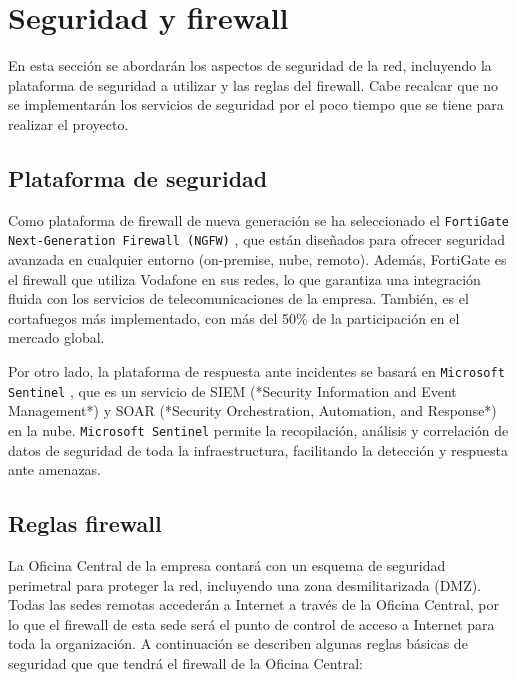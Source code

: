 \section{Seguridad y firewall}
En esta sección se abordarán los aspectos de seguridad de la red, incluyendo la plataforma de seguridad
a utilizar y las reglas del firewall. Cabe recalcar que no se implementarán los servicios de seguridad por
el poco tiempo que se tiene para realizar el proyecto.

\subsection{Plataforma de seguridad}
Como plataforma de firewall de nueva generación se ha seleccionado el \texttt{FortiGate Next-Generation Firewall (NGFW)} \cite{ngfw_fortinet}, que están diseñados para ofrecer seguridad avanzada en cualquier entorno (on-premise, nube, remoto). Además, FortiGate es el firewall que utiliza Vodafone en sus redes, lo que garantiza una integración fluida con los servicios de telecomunicaciones de la empresa. También, es el cortafuegos más implementado, con más del 50\% de la participación en el mercado global.

\vspace{0.5cm}
Por otro lado, la plataforma de respuesta ante incidentes se basará en \texttt{Microsoft Sentinel} \cite{microsoft_sentinel_overview}, que es un servicio de SIEM (*Security Information and Event Management*) y SOAR (*Security Orchestration, Automation, and Response*) en la nube. \texttt{Microsoft Sentinel} permite la recopilación, análisis y correlación de datos de seguridad de toda la infraestructura, facilitando la detección y respuesta ante amenazas.


\subsection{Reglas firewall}
La Oficina Central de la empresa contará con un esquema de seguridad perimetral para proteger la red, incluyendo una zona desmilitarizada (DMZ). Todas las sedes remotas accederán a Internet a través de la Oficina Central,
por lo que el firewall de esta sede será el punto de control de acceso a Internet para toda la organización. A continuación se describen algunas reglas básicas de seguridad que que tendrá el firewall de la Oficina Central:

